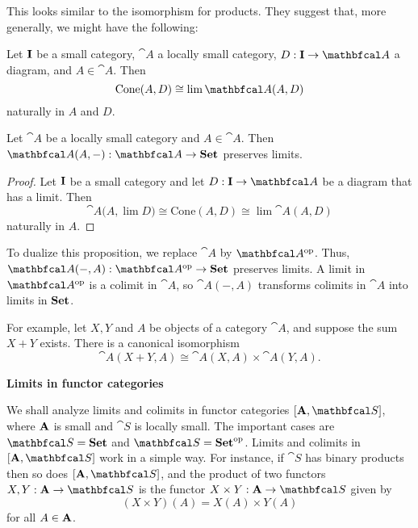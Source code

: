 This looks similar to the isomorphism for products. They suggest that, more generally, we might have the following:

\begin{lemma}
    Let $\mathbf{I}$ be a small category, $\cat{A}$ a locally small category, $D:\bcat{I}\to\cat{A}$ a diagram, and $A\in\cat{A}$. Then
    \begin{equation*}
        \textup{Cone}(A,D)\cong\lim{\cat{A}(A,D)}
    \end{equation*}
    naturally in $A$ and $D$.
\end{lemma}

\begin{proposition}
    Let $\cat{A}$ be a locally small category and $A\in\cat{A}$. Then $\cat{A}(A,-): \cat{A}\to\bcat{Set}$ preserves limits.
\end{proposition}
\begin{proof}
    Let $\mathbf{I}$ be a small category and let $D:\bcat{I}\to\cat{A}$ be a diagram that has a limit. Then
    \begin{equation*}
        \cat{A}{\Big( A,\lim{D} \Big)} \cong \text{Cone}(A,D) \cong \lim{\cat{A}(A,D)}
    \end{equation*}
    naturally in $A$.
\end{proof}

To dualize this proposition, we replace $\cat{A}$ by $\catop{A}$. Thus, $\cat{A}(-,A):\catop{A}\to\bcat{Set}$ preserves limits. A limit in $\catop{A}$ is a colimit in $\cat{A}$, so $\cat{A}(-,A)$ transforms colimits in $\cat{A}$ into limits in $\mathbf{Set}$.\par

For example, let $X,Y$ and $A$ be objects of a category $\cat{A}$, and suppose the sum $X+Y$ exists. There is a canonical isomorphism
\begin{equation*}
    \cat{A}(X+Y,A) \cong \cat{A}(X,A)\times \cat{A}(Y,A).
\end{equation*}

\begin{center}
    \textbf{Limits in functor categories}
\end{center}
We shall analyze limits and colimits in functor categories $[\bcat{A},\cat{S}]$, where $\mathbf{A}$ is small and $\cat{S}$ is locally small. The important cases are $\cat{S}=\bcat{Set}$ and $\cat{S}=\bcatop{Set}$. Limits and colimits in $[\bcat{A},\cat{S}]$ work in a simple way. For instance, if $\cat{S}$ has binary products then so does $[\bcat{A}, \cat{S}]$, and the product of two functors $X,Y:\bcat{A}\to\cat{S}$ is the functor $X\times Y:\bcat{A}\to\cat{S}$ given by
\begin{equation*}
    (X\times Y)(A) = X(A)\times Y(A)
\end{equation*}
for all $A\in\mathbf{A}$.

